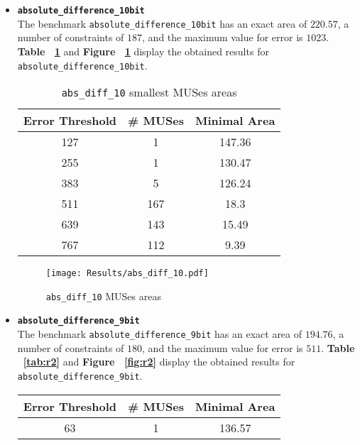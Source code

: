 \documentclass[]{usiinfbachelorproject}
\begin{document}
\begin{itemize}
    \item \texttt{\textbf{absolute\_difference\_10bit}}\\
        The benchmark \texttt{absolute\_difference\_10bit} has an exact area of $220.57$, a number of constraints of $187$, and the maximum value for error is $1023$. \textbf{Table ~\ref{tab:r1}} and \textbf{Figure ~\ref{fig:r1}} display the obtained results for \texttt{absolute\_difference\_10bit}.
        \begin{table}[H]
            \centering
            \begin{tabular}{c|c|c}
                \textbf{Error Threshold} & \textbf{\# MUSes} & \textbf{Minimal Area} \\ \hline
                127 & 1 & 147.36 \\
                \hline
                255 & 1 & 130.47 \\
                \hline
                383 & 5 & 126.24 \\
                \hline
                511 & 167 & 18.3 \\
                \hline
                639 & 143 & 15.49 \\
                \hline
                767 & 112 & 9.39    
            \end{tabular}
            \caption{\texttt{abs\_diff\_10} smallest MUSes areas}
            \label{tab:r1}
        \end{table}
        \begin{figure}[H]
            \centering
            \texttt{[image: Results/abs\_diff\_10.pdf]}
            \caption{\texttt{abs\_diff\_10} MUSes areas}
            \label{fig:r1}
        \end{figure}
    \item \texttt{\textbf{absolute\_difference\_9bit}}\\
        The benchmark \texttt{absolute\_difference\_9bit} has an exact area of $194.76$, a number of constraints of $180$, and the maximum value for error is $511$. \textbf{Table ~\ref{tab:r2}} and \textbf{Figure ~\ref{fig:r2}} display the obtained results for \texttt{absolute\_difference\_9bit}.
        \begin{table}[H]
            \centering
            \begin{tabular}{c|c|c}
                \textbf{Error Threshold} & \textbf{\# MUSes} & \textbf{Minimal Area} \\ \hline
                63 & 1 & 136.57 \\

\end{tabular}
\end{table}
\end{itemize}
\end{document}
